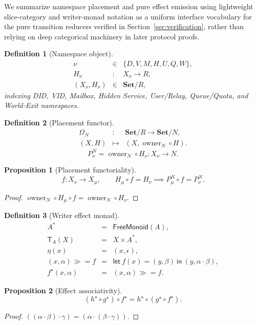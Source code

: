 \documentclass[journal]{IEEEtran}
\newtheorem{definition}{Definition}
\newtheorem{proposition}{Proposition}
\begin{document}
We summarize namespace placement and pure effect emission using lightweight slice-category and writer-monad notation as a uniform interface vocabulary for the pure transition reducers verified in Section~\ref{sec:verification}, rather than relying on deep categorical machinery in later protocol proofs.

\begin{definition}[Namespace object]
\[
\begin{array}{rcl}
\nu&\in&\{D,V,M,H,U,Q,W\},\\
H_\nu&:&X_\nu\to R,\\
(X_\nu,H_\nu)&\in&\mathbf{Set}/R,
\end{array}
\]
indexing DID, VID, Mailbox, Hidden Service, User/Relay, Queue/Quota, and World-Exit namespaces.
\end{definition}

\begin{definition}[Placement functor]
\[
\begin{array}{rcl}
  \Omega_N&:&\mathbf{Set}/R\to\mathbf{Set}/N,\\
  (X,H)&\mapsto&(X,\operatorname{owner}_N\circ H).
\end{array}
\]
\[
  P^N_\nu=\operatorname{owner}_N\circ H_\nu:X_\nu\to N.
\]
\end{definition}

\begin{proposition}[Placement functoriality]
\[
  f:X_\nu\to X_\mu,\qquad H_\mu\circ f=H_\nu
  \implies P^N_\mu\circ f=P^N_\nu.
\]
\end{proposition}
\begin{proof}
\(\operatorname{owner}_N\circ H_\mu\circ f = \operatorname{owner}_N\circ H_\nu\).
\end{proof}

\begin{definition}[Writer effect monad]
\[
\begin{array}{rcl}
  A^*&=&\mathsf{FreeMonoid}(A),\\
  \mathsf{T}_A(X)&=&X\times A^*,\\
  \eta(x)&=&(x,\epsilon),\\
  (x,\alpha)\mathbin{\gg\!=}f
    &=&
  \mathsf{let}\ f(x)=(y,\beta)\ \mathsf{in}\ (y,\alpha\cdot\beta),\\
  f^\star(x,\alpha)&=&(x,\alpha)\mathbin{\gg\!=}f.
\end{array}
\]
\end{definition}

\begin{proposition}[Effect associativity]
\[
  (h^\star\circ g^\star)\circ f^\star
  =
  h^\star\circ(g^\star\circ f^\star).
\]
\end{proposition}
\begin{proof}
\(((\alpha\cdot\beta)\cdot\gamma) = (\alpha\cdot(\beta\cdot\gamma))\).
\end{proof}
\end{document}
